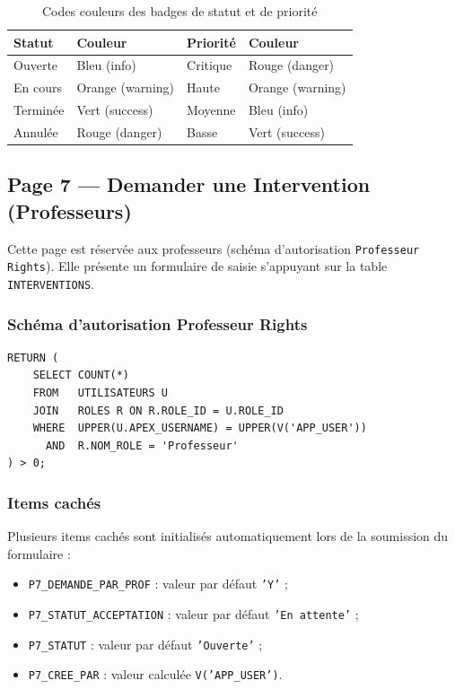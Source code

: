 \documentclass[12pt,a4paper,oneside]{report}
\begin{document}
\begin{table}[H]
  \centering
  \caption{Codes couleurs des badges de statut et de priorité}
  \begin{tabular}{@{}llll@{}}
    \toprule
    \textbf{Statut} & \textbf{Couleur} & \textbf{Priorité} & \textbf{Couleur} \\
    \midrule
    Ouverte   & Bleu (info)       & Critique & Rouge (danger) \\
    En cours  & Orange (warning)  & Haute    & Orange (warning) \\
    Terminée  & Vert (success)    & Moyenne  & Bleu (info) \\
    Annulée   & Rouge (danger)    & Basse    & Vert (success) \\
    \bottomrule
  \end{tabular}
  \label{tab:badges}
\end{table}

\subsection{Page 7 — Demander une Intervention (Professeurs)}

Cette page est réservée aux professeurs (schéma d'autorisation \texttt{Professeur Rights}). Elle présente un formulaire de saisie s'appuyant sur la table \texttt{INTERVENTIONS}.

\subsubsection{Schéma d'autorisation Professeur Rights}

\begin{lstlisting}[language=PLSQL, caption=Requête du schéma d'autorisation Professeur Rights]
RETURN (
    SELECT COUNT(*)
    FROM   UTILISATEURS U
    JOIN   ROLES R ON R.ROLE_ID = U.ROLE_ID
    WHERE  UPPER(U.APEX_USERNAME) = UPPER(V('APP_USER'))
      AND  R.NOM_ROLE = 'Professeur'
) > 0;
\end{lstlisting}

\subsubsection{Items cachés}

Plusieurs items cachés sont initialisés automatiquement lors de la soumission du formulaire :

\begin{itemize}[leftmargin=2em]
  \item \texttt{P7\_DEMANDE\_PAR\_PROF} : valeur par défaut \texttt{'Y'} ;
  \item \texttt{P7\_STATUT\_ACCEPTATION} : valeur par défaut \texttt{'En attente'} ;
  \item \texttt{P7\_STATUT} : valeur par défaut \texttt{'Ouverte'} ;
  \item \texttt{P7\_CREE\_PAR} : valeur calculée \texttt{V('APP\_USER')}.
\end{itemize}
\end{document}

